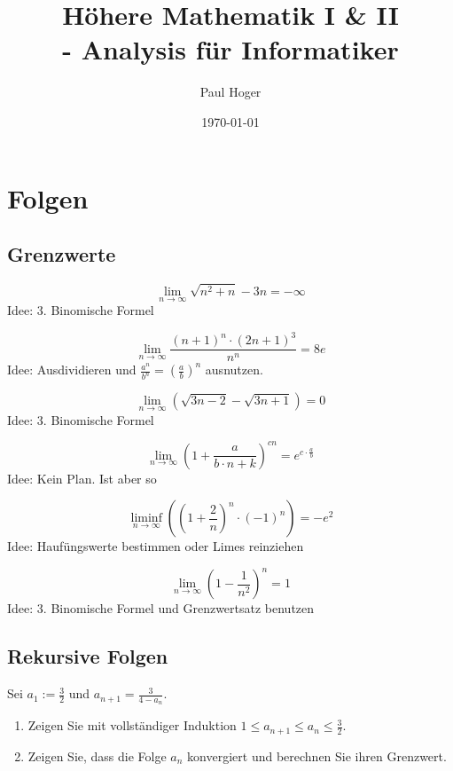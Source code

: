 \documentclass[parskip=full]{scrartcl}
\title{Höhere Mathematik I \& II\\- Analysis für Informatiker}
\author{Paul Hoger}
\date{\today}
\begin{document}
\maketitle

\tableofcontents

\section{Folgen}
\subsection{Grenzwerte}
\begin{displaymath}
  \lim_{n \to \infty} {\sqrt{n^2 + n} - 3n} = - \infty
\end{displaymath}
Idee: 3. Binomische Formel

\begin{displaymath}
  \lim_{n \to \infty} \frac{(n+1)^n \cdot (2n+1)^3}{n^n} = 8e
\end{displaymath}
Idee: Ausdividieren und $\frac{a^n}{b^n} = \left( \frac{a}{b}\right) ^n$ ausnutzen.

\begin{displaymath}
  \lim_{n \to \infty} (\sqrt{3n-2} - \sqrt{3n+1}) = 0
\end{displaymath}
Idee: 3. Binomische Formel

\begin{displaymath}
  \lim_{n \to \infty} \left(1 + \frac{a}{b \cdot n + k}\right)^{cn} = e^{c \cdot \frac{a}{b}}
\end{displaymath}
Idee: Kein Plan. Ist aber so

\begin{displaymath}
  \liminf_{n \to \infty} \left(\left(1 + \frac{2}{n}\right)^n \cdot (-1)^n \right) = -e^2
\end{displaymath}
Idee: Haufüngswerte bestimmen oder Limes reinziehen

\begin{displaymath}
  \lim_{n \to \infty} \left(1 - \frac{1}{n^2}\right)^n = 1
\end{displaymath}
Idee: 3. Binomische Formel und Grenzwertsatz benutzen

\subsection{Rekursive Folgen}
Sei $a_1 := \frac{3}{2}$ und $a_{n+1} = \frac{3}{4-a_n}$.
\begin{enumerate}
    \item Zeigen Sie mit vollständiger Induktion $1 \leq a_{n+1} \leq a_n \leq \frac{3}{2}$.
    \item Zeigen Sie, dass die Folge $a_n$ konvergiert und berechnen Sie ihren Grenzwert.
\end{enumerate}
\end{document}

